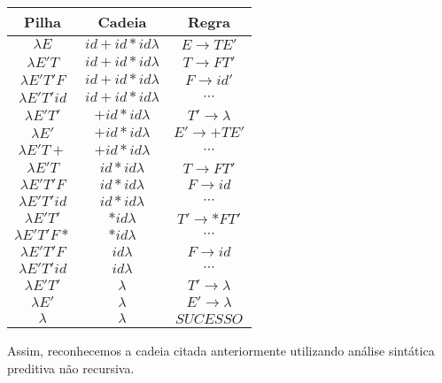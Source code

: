 \documentclass{article}
\begin{document}
\begin{center}
\begin{tabular}{c|c|c}
Pilha & Cadeia & Regra\\
\hline
$\lambda E$ & $id + id * id\lambda$ & $E \rightarrow TE'$\\
$\lambda E'T$ & $id + id * id\lambda$ & $T \rightarrow FT'$\\
$\lambda E'T'F$ & $id + id * id\lambda$ & $F \rightarrow id'$\\
$\lambda E'T'id$ & $id + id * id\lambda$ & $\cdots$\\
$\lambda E'T'$ & $+ id * id\lambda$ & $T' \rightarrow \lambda$\\
$\lambda E'$ & $+ id * id\lambda$ & $E' \rightarrow +TE'$\\
$\lambda E'T+$ & $+ id * id\lambda$ & $\cdots$\\
$\lambda E'T$ & $id * id\lambda$ & $T \rightarrow FT'$\\
$\lambda E'T'F$ & $id * id\lambda$ & $F \rightarrow id$\\
$\lambda E'T'id$ & $id * id\lambda$ & $\cdots$\\
$\lambda E'T'$ & $* id\lambda$ & $T' \rightarrow *FT'$\\
$\lambda E'T'F*$ & $* id\lambda$ & $\cdots$\\
$\lambda E'T'F$ & $id\lambda$ & $F \rightarrow id$\\
$\lambda E'T'id$ & $id\lambda$ & $\cdots$\\
$\lambda E'T'$ & $\lambda$ & $T' \rightarrow \lambda$\\
$\lambda E'$ & $\lambda$ & $E' \rightarrow \lambda$\\
$\lambda$ & $\lambda$ & $SUCESSO$\\
\end{tabular}
\end{center}

Assim, reconhecemos a cadeia citada anteriormente utilizando análise sintática preditiva não recursiva.
\end{document}

